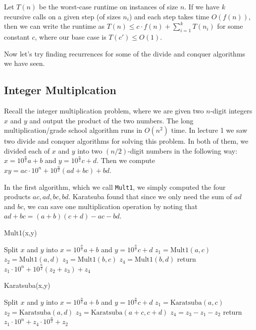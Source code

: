 \documentclass [12pt]{article}
\begin{document}
Let $T(n)$ be the worst-case runtime on instances of size $n$. If we have $k$ recursive calls on a given step (of sizes $n_i$) and each step takes time $O(f (n))$, then we can write the runtime as $T(n) \leq c \cdot f (n) + \sum_{i=1}^k T(n_i)$ for some constant $c$, where our base case is $T(c') \leq O(1)$.

Now let’s try finding recurrences for some of the divide and conquer algorithms we have seen.

\subsection{Integer Multiplcation}
Recall the integer multiplication problem, where we are given two $n$-digit integers $x$ and $y$ and output the product of the two numbers. The long multiplication/grade school algorithm runs in $O(n^2)$ time. In lecture 1 we saw two divide and conquer algorithms for solving this problem.
In both of them, we divided each of $x$ and $y$ into two $(n/2)$-digit numbers in the following
way: $x = 10^{\frac{n}{2}} a + b$ and $y = 10^{\frac{n}{2}} c + d$. Then we compute $xy = ac\cdot 10^n + 10^{\frac{n}{2}} (ad + bc) + bd$.

In the first algorithm, which we call \texttt{Mult1}, we simply computed the four products $ac, ad, bc, bd$. Karatsuba found that since we only need the sum of $ad$ and $bc$, we can save one multiplication operation by noting that $ad + bc = (a + b)(c + d) - ac - bd$.

\begin{algorithm}
\caption{Mult1(x,y)}\label{alg:mult1}
\begin{algorithmic}
\STATE Split $x$ and $y$ into $x = 10^{\frac{n}{2}} a + b$ and $y = 10^{\frac{n}{2}} c + d$
\STATE $z_1 = \text{Mult1}(a, c)$
\STATE $z_2 = \text{Mult1}(a, d)$
\STATE $z_3 = \text{Mult1}(b, c)$
\STATE $z_4 = \text{Mult1}(b, d)$
\STATE return $z_1\cdot 10^n + 10^{\frac{n}{2}} (z_2 + z_3) + z_4$
\end{algorithmic}
\end{algorithm}

\begin{algorithm}
\caption{Karatsuba(x,y)}\label{alg:karatsuba}
\begin{algorithmic}
\STATE Split $x$ and $y$ into $x = 10^{\frac{n}{2}} a + b$ and $y = 10^{\frac{n}{2}} c + d$
\STATE $z_1 = \text{Karatsuba}(a, c)$
\STATE $z_2 = \text{Karatsuba}(a, d)$
\STATE $z_3 = \text{Karatsuba}(a+c, c+d)$
\STATE $z_4 = z_3 - z_1 - z_2$
\STATE return $z_1\cdot 10^n + z_4 \cdot 10^{\frac{n}{2}} + z_2$
\end{algorithmic}
\end{algorithm}
\end{document}
